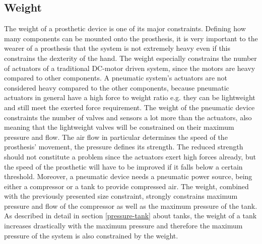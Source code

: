 \documentclass[main]{subfiles}
\begin{document}
\subsection{Weight}

The weight of a prosthetic device is one of its major constraints. Defining how many components can be mounted onto the prosthesis, it is very important to the wearer of a prosthesis that the system is not extremely heavy even if this constrains the dexterity of the hand. The weight especially constrains the number of actuators of a traditional DC-motor driven system, since the motors are heavy compared to other components.  A pneumatic system's actuators are not considered heavy compared to the other components, because pneumatic actuators in general have a high force to weight ratio e.g. they can be lightweight and still meet the exerted force requirement. The weight of the pneumatic device constraints the number of valves and sensors a lot more than the actuators, also meaning that the lightweight valves will be constrained on their maximum pressure and flow. The air flow in particular determines the speed of the prosthesis' movement, the pressure defines its strength. The reduced strength should not constitute a problem since the actuators exert high forces already, but the speed of the prosthetic will have to be improved if it falls below a certain threshold. Moreover, a pneumatic device needs a pneumatic power source, being either a compressor or a tank to provide compressed air. The weight, combined with the previously presented size constraint, strongly constrains maximum pressure and flow of the compressor as well as the maximum pressure of the tank. As described in detail in section \ref{pressure-tank} about tanks, the weight of a tank increases drastically with the maximum pressure and therefore the maximum pressure of the system is also constrained by the weight.\\ 
\end{document}
